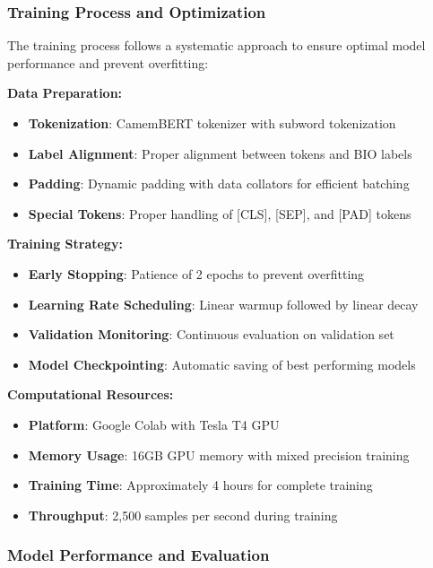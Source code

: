 \documentclass[12pt,a4paper]{article}
\begin{document}
\subsubsection{Training Process and Optimization}

The training process follows a systematic approach to ensure optimal model performance and prevent overfitting:

\textbf{Data Preparation:}
\begin{itemize}
    \item \textbf{Tokenization}: CamemBERT tokenizer with subword tokenization
    \item \textbf{Label Alignment}: Proper alignment between tokens and BIO labels
    \item \textbf{Padding}: Dynamic padding with data collators for efficient batching
    \item \textbf{Special Tokens}: Proper handling of [CLS], [SEP], and [PAD] tokens
\end{itemize}

\textbf{Training Strategy:}
\begin{itemize}
    \item \textbf{Early Stopping}: Patience of 2 epochs to prevent overfitting
    \item \textbf{Learning Rate Scheduling}: Linear warmup followed by linear decay
    \item \textbf{Validation Monitoring}: Continuous evaluation on validation set
    \item \textbf{Model Checkpointing}: Automatic saving of best performing models
\end{itemize}

\textbf{Computational Resources:}
\begin{itemize}
    \item \textbf{Platform}: Google Colab with Tesla T4 GPU
    \item \textbf{Memory Usage}: 16GB GPU memory with mixed precision training
    \item \textbf{Training Time}: Approximately 4 hours for complete training
    \item \textbf{Throughput}: 2,500 samples per second during training
\end{itemize}

\subsubsection{Model Performance and Evaluation}
\end{document}
